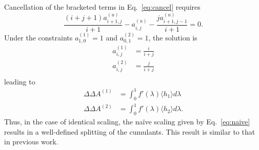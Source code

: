 \documentclass{article}
\begin{document}
Cancellation of the bracketed terms in Eq.~\ref{eq:cancel} requires
\begin{equation}
\frac
	{(i+j+1)a_{i+1,j}^{(u)}}
	{i+1} -
a_{i,j}^{(u)} -
\frac
	{j a_{i+1,j-1}^{(u)}}
	{i+1}
= 0.
\end{equation}
Under the constraints $a_{1,0}^{(1)} = 1$ and $a_{0,1}^{(2)} = 1$, the solution is
\begin{align}
a_{i,j}^{(1)} &= \frac{i}{i+j} \nonumber\\
a_{i,j}^{(2)} &= \frac{j}{i+j} \nonumber\\
\label{eq:splitting}
\end{align}
leading to
\begin{equation}
\begin{split}
\Delta\Delta A^{(1)} &= 
	\int_0^1 f'(\lambda)
    \langle h_1 \rangle 
    d\lambda \\
\Delta\Delta A^{(2)} &= 
	\int_0^1 f'(\lambda)
    \langle h_2 \rangle
    d\lambda.
\end{split}
\end{equation}
Thus, in the case of identical scaling, the na\"ive scaling given by Eq.~\ref{eq:naive} results in a well-defined splitting of the cumulants. This result is similar to that in previous work.



\end{document}
